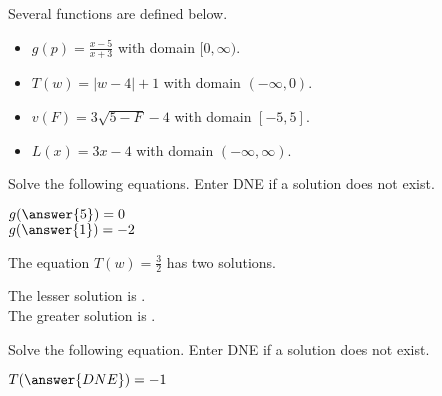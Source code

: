 \documentclass{ximera}
\begin{document}
\begin{definition}
Several functions are defined below.
\begin{itemize}
\item $g(p) = \frac{x-5}{x+3}$ with domain $[0, \infty)$. \\ \quad
\item $T(w) = | w - 4 | + 1$ with domain $(-\infty, 0)$. 
\item $v(F) = 3\sqrt{5 - F} - 4$ with domain $[-5, 5]$. 
\item $L(x) = 3x - 4$ with domain $(-\infty, \infty)$. 
\end{itemize}
\end{definition}



\begin{exercise}
Solve the following equations.  Enter DNE if a solution does not exist.

$g( \answer{5} ) = 0$   \\
$g( \answer{1} ) = -2$  

\end{exercise}




\begin{exercise}
The equation $T(w) = \frac{3}{2}$ has two solutions.  

The lesser solution is  .  \\
The greater solution is  .

\end{exercise}



\begin{exercise}
Solve the following equation.  Enter DNE if a solution does not exist.

$T( \answer{DNE} ) = -1$   


\end{exercise}
\end{document}
